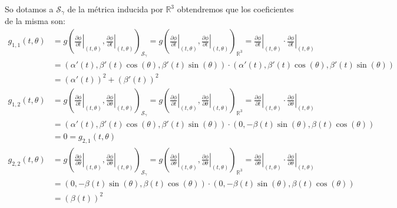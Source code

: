 \begin{example}
	So dotamos a $\mathcal{S}_{\gamma}$ de la métrica inducida por $\mathbb{R}^3$ obtendremos que los coeficientes de la misma son:
	\begin{align*}
		g_{1,1}(t,\theta) & = g \left(
		\left. \frac{\partial \phi}{\partial t}\right|_{(t,\theta)},
		\left. \frac{\partial \phi}{\partial t}\right|_{(t,\theta)}
		\right)_{\mathcal{S}_{\gamma}} =
		g \left(
		\left. \frac{\partial \phi}{\partial t}\right|_{(t,\theta)},
		\left. \frac{\partial \phi}{\partial t}\right|_{(t,\theta)}
		\right)_{\mathbb{R}^{3}}                                   =
		\left. \frac{\partial \phi}{\partial t}\right|_{(t,\theta)} \cdot
		\left. \frac{\partial \phi}{\partial t}\right|_{(t,\theta)}      \\[12pt]
		                  & =
		(\alpha'(t), \beta'(t) \cos(\theta), \beta'(t)\sin(\theta)) \cdot
		(\alpha'(t), \beta'(t) \cos(\theta), \beta'(t)\sin(\theta))      \\
		                  & =
		(\alpha'(t))^{2} + (\beta'(t))^{2}                               \\[12pt]
		g_{1,2}(t,\theta) & = g \left(
		\left. \frac{\partial \phi}{\partial t}\right|_{(t,\theta)},
		\left. \frac{\partial \phi}{\partial \theta}\right|_{(t,\theta)}
		\right)_{\mathcal{S}_{\gamma}} =
		g \left(
		\left. \frac{\partial \phi}{\partial t}\right|_{(t,\theta)},
		\left. \frac{\partial \phi}{\partial \theta}\right|_{(t,\theta)}
		\right)_{\mathbb{R}^{3}}                                   =
		\left. \frac{\partial \phi}{\partial t}\right|_{(t,\theta)} \cdot
		\left. \frac{\partial \phi}{\partial \theta}\right|_{(t,\theta)} \\[12pt]
		                  & =
		(\alpha'(t), \beta'(t) \cos(\theta), \beta'(t)\sin(\theta)) \cdot
		(0, -\beta(t) \sin(\theta), \beta(t)\cos(\theta))                \\[12pt]
		                  & =
		0 = g_{2,1}(t,\theta)                                            \\[12pt]
		g_{2,2}(t,\theta) & = g \left(
		\left. \frac{\partial \phi}{\partial \theta}\right|_{(t,\theta)},
		\left. \frac{\partial \phi}{\partial \theta}\right|_{(t,\theta)}
		\right)_{\mathcal{S}_{\gamma}} =
		g \left(
		\left. \frac{\partial \phi}{\partial \theta}\right|_{(t,\theta)},
		\left. \frac{\partial \phi}{\partial \theta}\right|_{(t,\theta)}
		\right)_{\mathbb{R}^{3}}                                   =
		\left. \frac{\partial \phi}{\partial \theta}\right|_{(t,\theta)} \cdot
		\left. \frac{\partial \phi}{\partial \theta}\right|_{(t,\theta)} \\[12pt]
		                  & =
		(0, -\beta(t) \sin(\theta), \beta(t)\cos(\theta))   \cdot
		(0, -\beta(t) \sin(\theta), \beta(t)\cos(\theta))                \\[12pt]
		                  & =
		(\beta(t))^{2}
	\end{align*}
\end{example}

